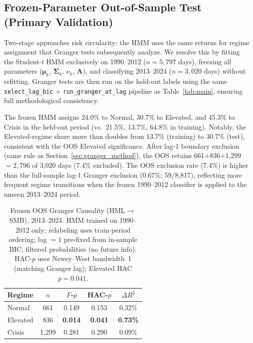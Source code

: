 \documentclass[sigconf,anonymous]{acmart}
\begin{document}
\subsection{Frozen-Parameter Out-of-Sample Test (Primary Validation)}
\label{sec:frozen_oos}

Two-stage approaches risk circularity: the HMM uses the same returns for
regime assignment that Granger tests subsequently analyze.
We resolve this by fitting the Student-$t$ HMM exclusively on 1990--2012
($n = 5{,}797$ days), freezing all parameters
($\boldsymbol{\mu}_k$, $\boldsymbol{\Sigma}_k$, $\nu_k$, $\mathbf{A}$),
and classifying 2013--2024 ($n = 3{,}020$ days) without refitting.
Granger tests are then run on the held-out labels using the same
\texttt{select\_lag\_bic} + \texttt{run\_granger\_at\_lag} pipeline as Table~\ref{tab:main},
ensuring full methodological consistency.

The frozen HMM assigns 24.0\% to Normal, 30.7\% to Elevated, and 45.3\%
to Crisis in the held-out period (vs.\ 21.5\%, 13.7\%, 64.8\% in training).
Notably, the Elevated-regime share more than doubles from 13.7\% (training)
to 30.7\% (test), consistent with the OOS Elevated significance.
After lag-1 boundary exclusion (same rule as Section~\ref{sec:granger_method}),
the OOS retains 661$+$836$+$1{,}299$=2{,}796$ of 3,020 days (7.4\% excluded).
The OOS exclusion rate (7.4\%) is higher than the full-sample lag-1 Granger exclusion
(0.67\%; 59/8,817), reflecting more frequent regime transitions when the
frozen 1990--2012 classifier is applied to the unseen 2013--2024 period.

\begin{table}[t]
\centering
\setlength{\tabcolsep}{5pt}
\caption{Frozen OOS Granger Causality (HML$\to$SMB), 2013--2024.
HMM trained on 1990--2012 only; relabeling uses train-period ordering;
lag $= 1$ pre-fixed from in-sample BIC; filtered probabilities (no future info).
HAC-$p$ uses Newey--West bandwidth~1 (matching Granger lag); Elevated HAC $p = 0.041$.}
\label{tab:frozen_granger}
\small
\begin{tabular}{@{}lcccc@{}}
\toprule
Regime & $n$ & $F$-$p$ & HAC-$p$ & $\Delta R^2$ \\
\midrule
Normal    & 661 & 0.149 & 0.153 & 0.32\% \\
Elevated  & 836 & \textbf{0.014} & \textbf{0.041} & \textbf{0.73\%} \\
Crisis    & 1,299 & 0.281 & 0.290 & 0.09\% \\
\bottomrule
\end{tabular}
\end{table}
\end{document}
